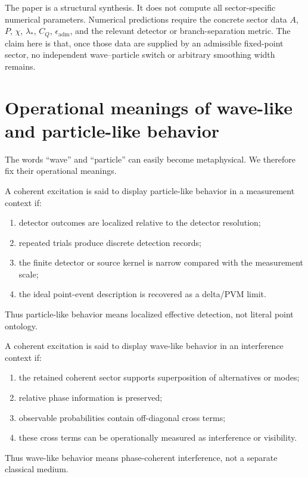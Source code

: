 \documentclass[11pt]{article}
\newcommand{\epsadm}{\epsilon_{\mathrm{adm}}}
\begin{document}
\begin{remark}
The paper is a structural synthesis. It does not compute all sector-specific numerical
parameters. Numerical predictions require the concrete sector data \(A\), \(P\), \(\chi\),
\(\lambda_\ast\), \(C_Q\), \(\epsadm\), and the relevant detector or branch-separation metric.
The claim here is that, once those data are supplied by an admissible fixed-point sector, no
independent wave--particle switch or arbitrary smoothing width remains.
\end{remark}

\section{Operational meanings of wave-like and particle-like behavior}

The words ``wave'' and ``particle'' can easily become metaphysical. We therefore fix their
operational meanings.

\begin{definition}
A coherent excitation is said to display particle-like behavior in a measurement context if:
\begin{enumerate}[label=(\roman*)]
  \item detector outcomes are localized relative to the detector resolution;
  \item repeated trials produce discrete detection records;
  \item the finite detector or source kernel is narrow compared with the measurement scale;
  \item the ideal point-event description is recovered as a delta/PVM limit.
\end{enumerate}
Thus particle-like behavior means localized effective detection, not literal point ontology.
\end{definition}

\begin{definition}
A coherent excitation is said to display wave-like behavior in an interference context if:
\begin{enumerate}[label=(\roman*)]
  \item the retained coherent sector supports superposition of alternatives or modes;
  \item relative phase information is preserved;
  \item observable probabilities contain off-diagonal cross terms;
  \item these cross terms can be operationally measured as interference or visibility.
\end{enumerate}
Thus wave-like behavior means phase-coherent interference, not a separate classical medium.
\end{definition}
\end{document}
